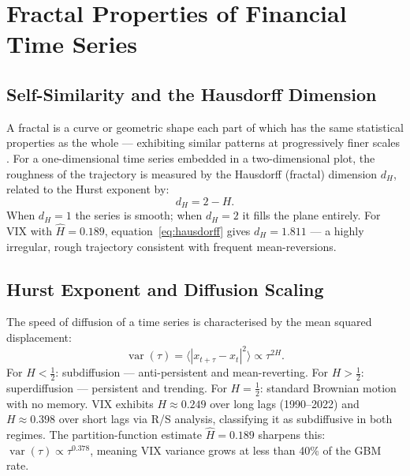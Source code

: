 \documentclass[12pt,a4paper]{article}
\begin{document}
\section{Fractal Properties of Financial Time Series}

\subsection{Self-Similarity and the Hausdorff Dimension}

A fractal is a curve or geometric shape each part of which has the same
statistical properties as the whole --- exhibiting similar patterns at
progressively finer scales \citep{saupe1988}. For a one-dimensional
time series embedded in a two-dimensional plot, the roughness of the
trajectory is measured by the Hausdorff (fractal) dimension $d_H$,
related to the Hurst exponent by:
\begin{equation}
  d_H = 2 - H.
  \label{eq:hausdorff}
\end{equation}
When $d_H = 1$ the series is smooth; when $d_H = 2$ it fills the
plane entirely. For VIX with $\hat{H} = 0.189$,
equation~\eqref{eq:hausdorff} gives $d_H = 1.811$ --- a highly
irregular, rough trajectory consistent with frequent mean-reversions.

\subsection{Hurst Exponent and Diffusion Scaling}

The speed of diffusion of a time series is characterised by the mean
squared displacement:
\begin{equation}
  \operatorname{var}(\tau)
  = \bigl\langle |x_{t+\tau} - x_t|^2 \bigr\rangle
  \propto \tau^{2H}.
  \label{eq:var-hurst}
\end{equation}
For $H < \tfrac{1}{2}$: subdiffusion --- anti-persistent and
mean-reverting. For $H > \tfrac{1}{2}$: superdiffusion --- persistent
and trending. For $H = \tfrac{1}{2}$: standard Brownian motion with
no memory. VIX exhibits $H \approx 0.249$ over long lags (1990--2022)
and $H \approx 0.398$ over short lags via R/S analysis, classifying it
as subdiffusive in both regimes. The partition-function estimate
$\hat{H} = 0.189$ sharpens this: $\operatorname{var}(\tau) \propto
\tau^{0.378}$, meaning VIX variance grows at less than 40\% of the
GBM rate.
\end{document}
